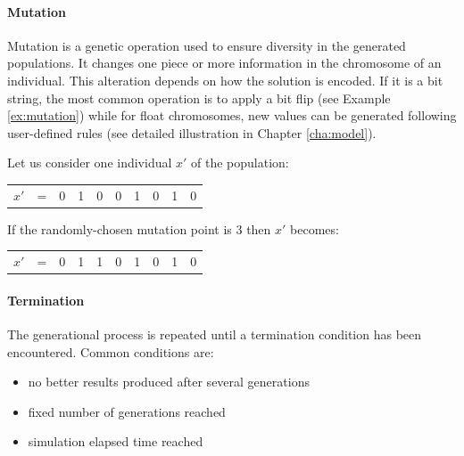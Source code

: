 \paragraph{Mutation}
Mutation is a genetic operation used to ensure diversity in the generated populations. It changes one piece or more information in the chromosome of an individual. This alteration depends on how the solution is encoded. If it is a bit string, the most common operation is to apply a bit flip (see Example \ref{ex:mutation}) while for float chromosomes, new values can be generated following user-defined rules (see detailed illustration in Chapter \ref{cha:model}).

\begin{example}
\label{ex:mutation}
Let us consider one individual $x'$ of the population:
\begin{table}[h!]
\begin{center}
\begin{tabular}{cccccccccc}
$x'$ & = & 0 & 1 & 0 & 0 & 1 & 0 & 1 & 0\\
\end{tabular}
\end{center}
\end{table}
\end{example}

\noindent
If the randomly-chosen mutation point is 3 then $x'$ becomes:
\begin{table}[h!]
\begin{center}
\begin{tabular}{cccc|c|ccccc}
\cline{5-5}
$x'$ & = & 0 & 1 & 1 & 0 & 1 & 0 & 1 & 0\\
\cline{5-5}
\end{tabular}
\end{center}
\end{table}

\paragraph{Termination}
The generational process is repeated until a termination condition has been encountered. Common conditions are:
\begin{itemize}
\item no better results produced after several generations
\item fixed number of generations reached
\item simulation elapsed time reached
\end{itemize}

